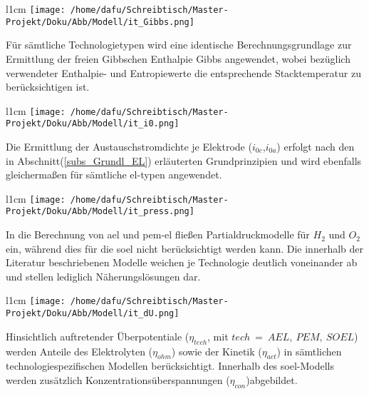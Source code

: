 \documentclass[onecolumn,10pt,titlepage]{article}
\begin{document}
\begin{wrapfigure}{l}{1cm}
	\texttt{[image: /home/dafu/Schreibtisch/Master-Projekt/Doku/Abb/Modell/it\_Gibbs.png]}
\end{wrapfigure}
Für sämtliche Technologietypen wird eine identische Berechnungsgrundlage zur Ermittlung der freien Gibbschen Enthalpie %
\gls{Gibbs} angewendet, wobei bezüglich verwendeter Enthalpie- und Entropiewerte die entsprechende Stacktemperatur  zu berücksichtigen ist.\\
\begin{wrapfigure}{l}{1cm}
	\texttt{[image: /home/dafu/Schreibtisch/Master-Projekt/Doku/Abb/Modell/it\_i0.png]}
\end{wrapfigure}
Die Ermittlung der Austauschstromdichte je Elektrode ($i_{0c}$,$i_{0a}$) erfolgt  nach den in Abschnitt(\ref{subs_Grundl_EL}) erläuterten Grundprinzipien und wird ebenfalls gleichermaßen für sämtliche \gls{el}-typen angewendet.
\newline

\begin{wrapfigure}{l}{1cm}
	\texttt{[image: /home/dafu/Schreibtisch/Master-Projekt/Doku/Abb/Modell/it\_press.png]}
\end{wrapfigure}
 In die Berechnung von \gls{ael} und \gls{pem}-\gls{el} fließen Partialdruckmodelle für $H_2$ und $O_2$ ein, während dies für die \gls{soel} nicht berücksichtigt werden kann. Die innerhalb der Literatur beschriebenen Modelle weichen je Technologie deutlich voneinander ab und stellen lediglich Näherungslösungen dar.\\
\newline

\begin{wrapfigure}{l}{1cm}
	\texttt{[image: /home/dafu/Schreibtisch/Master-Projekt/Doku/Abb/Modell/it\_dU.png]}
\end{wrapfigure}
Hinsichtlich auftretender Überpotentiale ($\eta_{tech}$, mit $tech ~=~AEL,~PEM,~SOEL$) werden Anteile des Elektrolyten ($\eta_{ohm}$) sowie der Kinetik ($\eta_{act}$) in sämtlichen technologiespezifischen Modellen berücksichtigt. Innerhalb des \gls{soel}-Modells werden zusätzlich Konzentrationsüberspannungen ($\eta_{con}$)abgebildet.\\
\newline
\end{document}
